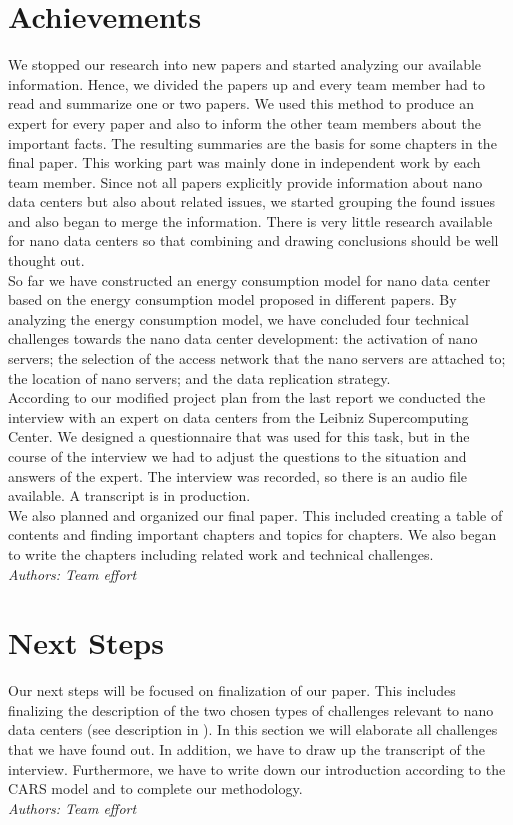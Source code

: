 \documentclass[sigchi-a, authorversion]{acmart}
\begin{document}
\section{Achievements}
\label{sec:achievements}
We stopped our research into new papers and started analyzing our available information. Hence, we divided the papers up and every team member had to read and summarize one or two papers. We used this method to produce an expert for every paper and also to inform the other team members about the important facts. The resulting summaries are the basis for some chapters in the final paper. This working part was mainly done in independent work by each team member. Since not all papers explicitly provide information about nano data centers but also about related issues, we started grouping the found issues and also began to merge the information. There is very little research available for nano data centers so that combining and drawing conclusions should be well thought out.\\
So far we have constructed an energy consumption model for nano data center based on the energy consumption model proposed in different papers. By analyzing the energy consumption model, we have concluded four technical challenges towards the nano data center development: the activation of nano servers; the selection of the access network that the nano servers are attached to; the location of nano servers; and the data replication strategy.\\
According to our modified project plan from the last report we conducted the interview with an expert on data centers from the Leibniz Supercomputing Center. We designed a questionnaire that was used for this task, but in the course of the interview we had to adjust the questions to the situation and answers of the expert. The interview was recorded, so there is an audio file available. A transcript is in production.\\
We also planned and organized our final paper. This included creating a table of contents and finding important chapters and topics for chapters. We also began to write the chapters including related work and technical challenges.\\
\textit{Authors: Team effort}\\

\section{Next Steps}
\label{sec:next_steps}
Our next steps will be focused on finalization of our paper. This includes finalizing the description of the two chosen types of challenges relevant to nano data centers (see description in ). In this section we will elaborate all challenges that we have found out. In addition, we have to draw up the transcript of the interview. Furthermore, we have to write down our introduction according to the CARS model and to complete our methodology.\\
\textit{Authors: Team effort}\\
\end{document}
